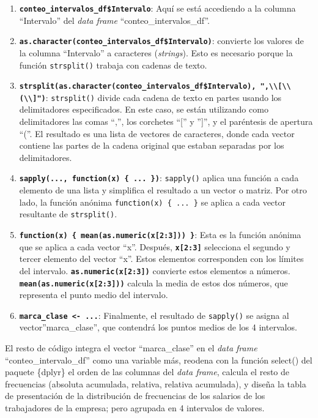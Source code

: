 \documentclass[
]{book}
\begin{document}
\begin{enumerate}
\def\labelenumi{\arabic{enumi}.}
\item
  \textbf{\texttt{conteo\_intervalos\_df\$Intervalo}}: Aquí se está accediendo a la columna ``Intervalo'' del \emph{data frame} ``conteo\_intervalos\_df''.
\item
  \textbf{\texttt{as.character(conteo\_intervalos\_df\$Intervalo)}}: convierte los valores de la columna ``Intervalo'' a caracteres (\emph{strings}).
  Esto es necesario porque la función \texttt{strsplit()} trabaja con cadenas de texto.
\item
  \textbf{\texttt{strsplit(as.character(conteo\_intervalos\_df\$Intervalo),\ ",\textbar{}\textbackslash{}\textbackslash{}{[}\textbar{}\textbackslash{}\textbackslash{}(\textbar{}\textbackslash{}\textbackslash{}{]}")}}: \texttt{strsplit()} divide cada cadena de texto en partes usando los delimitadores especificados.
  En este caso, se están utilizando como delimitadores las comas ``,'', los corchetes ``{[}'' y ''{]}'', y el paréntesis de apertura ``(''.
  El resultado es una lista de vectores de caracteres, donde cada vector contiene las partes de la cadena original que estaban separadas por los delimitadores.
\item
  \textbf{\texttt{sapply(...,\ function(x)\ \{\ ...\ \})}}: \texttt{sapply()} aplica una función a cada elemento de una lista y simplifica el resultado a un vector o matriz.
  Por otro lado, la función anónima \texttt{function(x)\ \{\ ...\ \}} se aplica a cada vector resultante de \texttt{strsplit()}.
\item
  \textbf{\texttt{function(x)\ \{\ mean(as.numeric(x{[}2:3{]}))\ \}}}: Esta es la función anónima que se aplica a cada vector ``x''.
  Después, \textbf{\texttt{x{[}2:3{]}}} selecciona el segundo y tercer elemento del vector ``x''.
  Estos elementos corresponden con los límites del intervalo.
  \textbf{\texttt{as.numeric(x{[}2:3{]})}} convierte estos elementos a números.
  \textbf{\texttt{mean(as.numeric(x{[}2:3{]}))}} calcula la media de estos dos números, que representa el punto medio del intervalo.
\item
  \textbf{\texttt{marca\_clase\ \textless{}-\ ...}}: Finalmente, el resultado de \texttt{sapply()} se asigna al vector''marca\_clase'', que contendrá los puntos medios de los 4 intervalos.
\end{enumerate}

El resto de código integra el vector ``marca\_clase'' en el \emph{data frame} ``conteo\_intervalo\_df'' como una variable más, reodena con la función select() del paquete \{dplyr\} el orden de las columnas del \emph{data frame}, calcula el resto de frecuencias (absoluta acumulada, relativa, relativa acumulada), y diseña la tabla de presentación de la distribución de frecuencias de los salarios de los trabajadores de la empresa; pero agrupada en 4 intervalos de valores.
\end{document}
